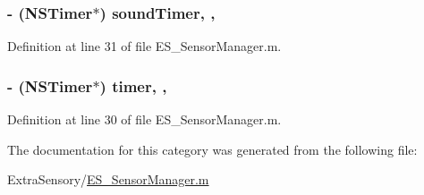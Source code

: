 \hypertarget{category_e_s___sensor_manager_07_08_abd0fdbf1ac2e99c813b3c53686d12ff5}{
\subsubsection[{sound\+Timer}]{\setlength{\rightskip}{0pt plus 5cm}-\/ (N\+S\+Timer$\ast$) sound\+Timer\hspace{0.3cm}{\ttfamily [read]}, {\ttfamily [write]}, {\ttfamily [atomic]}}}\label{category_e_s___sensor_manager_07_08_abd0fdbf1ac2e99c813b3c53686d12ff5}


Definition at line 31 of file E\+S\+\_\+\+Sensor\+Manager.\+m.

\hypertarget{category_e_s___sensor_manager_07_08_a8146be29d5acf7277d6f9b89e5ce79a3}{
\subsubsection[{timer}]{\setlength{\rightskip}{0pt plus 5cm}-\/ (N\+S\+Timer$\ast$) timer\hspace{0.3cm}{\ttfamily [read]}, {\ttfamily [write]}, {\ttfamily [atomic]}}}\label{category_e_s___sensor_manager_07_08_a8146be29d5acf7277d6f9b89e5ce79a3}


Definition at line 30 of file E\+S\+\_\+\+Sensor\+Manager.\+m.



The documentation for this category was generated from the following file\+:\begin{DoxyCompactItemize}
\item 
Extra\+Sensory/\hyperlink{_e_s___sensor_manager_8m}{E\+S\+\_\+\+Sensor\+Manager.\+m}\end{DoxyCompactItemize}

